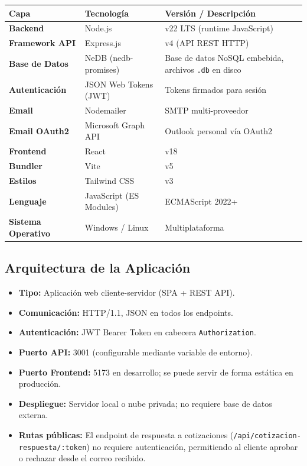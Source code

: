 \documentclass[12pt, letterpaper]{article}
\begin{document}
\begin{tabularx}{\linewidth}{>{\bfseries}l l X}
  \toprule
  \rowcolor{azulClaro}
  Capa              & Tecnología              & Versión / Descripción        \\
  \midrule
  Backend           & Node.js                 & v22 LTS (runtime JavaScript) \\
  Framework API     & Express.js              & v4 (API REST HTTP)           \\
  Base de Datos     & NeDB (nedb-promises)    & Base de datos NoSQL embebida,
                                               archivos \texttt{.db} en disco \\
  Autenticación     & JSON Web Tokens (JWT)   & Tokens firmados para sesión  \\
  Email             & Nodemailer              & SMTP multi-proveedor         \\
  Email OAuth2      & Microsoft Graph API     & Outlook personal vía OAuth2  \\
  Frontend          & React                   & v18                          \\
  Bundler           & Vite                    & v5                           \\
  Estilos           & Tailwind CSS            & v3                           \\
  Lenguaje          & JavaScript (ES Modules) & ECMAScript 2022+             \\
  Sistema Operativo & Windows / Linux         & Multiplataforma              \\
  \bottomrule
\end{tabularx}

\subsection{Arquitectura de la Aplicación}

\begin{itemize}
  \item \textbf{Tipo:} Aplicación web cliente-servidor (SPA + REST API).
  \item \textbf{Comunicación:} HTTP/1.1, JSON en todos los endpoints.
  \item \textbf{Autenticación:} JWT Bearer Token en cabecera \texttt{Authorization}.
  \item \textbf{Puerto API:} 3001 (configurable mediante variable de entorno).
  \item \textbf{Puerto Frontend:} 5173 en desarrollo; se puede servir de
        forma estática en producción.
  \item \textbf{Despliegue:} Servidor local o nube privada; no requiere
        base de datos externa.
  \item \textbf{Rutas públicas:} El endpoint de respuesta a cotizaciones
        (\texttt{/api/cotizacion-respuesta/:token}) no requiere autenticación,
        permitiendo al cliente aprobar o rechazar desde el correo recibido.
\end{itemize}
\end{document}
